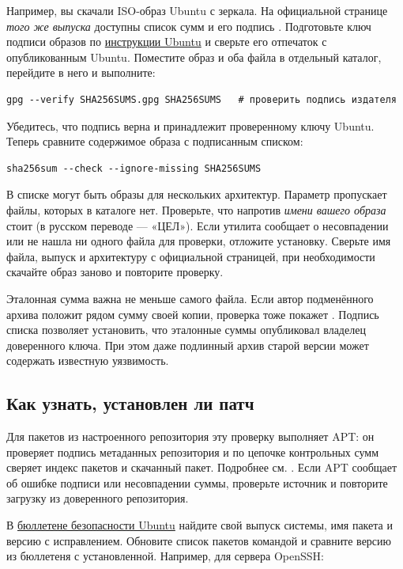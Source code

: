 Например, вы скачали ISO-образ Ubuntu с зеркала. На официальной странице
\emph{того же выпуска} доступны список сумм  и его
подпись . Подготовьте ключ подписи образов по
\href{https://ubuntu.com/tutorials/how-to-verify-ubuntu}{инструкции Ubuntu}
и сверьте его отпечаток с опубликованным Ubuntu. Поместите образ и оба
файла в отдельный каталог, перейдите в него и выполните:

\begin{verbatim}
gpg --verify SHA256SUMS.gpg SHA256SUMS   # проверить подпись издателя
\end{verbatim}

Убедитесь, что подпись верна и принадлежит проверенному ключу Ubuntu.
Теперь сравните содержимое образа с подписанным списком:

\begin{verbatim}
sha256sum --check --ignore-missing SHA256SUMS
\end{verbatim}

В списке могут быть образы для нескольких архитектур. Параметр
 пропускает файлы, которых в каталоге нет.
Проверьте, что напротив \emph{имени вашего образа} стоит 
(в русском переводе --- «ЦЕЛ»). Если утилита сообщает о несовпадении
или не нашла ни одного файла для проверки, отложите установку.
Сверьте имя файла, выпуск и архитектуру с официальной страницей,
при необходимости скачайте образ заново и повторите проверку.

Эталонная сумма важна не меньше самого файла. Если автор подменённого
архива положит рядом сумму своей копии, проверка тоже покажет .
Подпись списка позволяет установить, что эталонные суммы опубликовал
владелец доверенного ключа. При этом даже подлинный архив старой версии
может содержать известную уязвимость.

\subsection{Как узнать, установлен ли патч}

Для пакетов из настроенного репозитория эту проверку выполняет APT:
он проверяет подпись метаданных репозитория и по цепочке контрольных
сумм сверяет индекс пакетов и скачанный пакет. Подробнее см.
. Если APT сообщает об ошибке подписи или
несовпадении суммы, проверьте источник и повторите загрузку из
доверенного репозитория.

В \href{https://ubuntu.com/security/notices}{бюллетене безопасности Ubuntu}
найдите свой выпуск системы, имя пакета и версию с исправлением.
Обновите список пакетов командой  и сравните версию
из бюллетеня с установленной. Например, для сервера OpenSSH:

